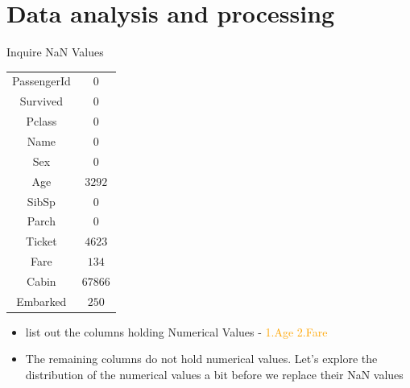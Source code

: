 \documentclass[
size=14pt,
paper=smartboard,  %
mode=present, 		%
display=slides, 	%
style=tuliplab,  	%
pauseslide,
fleqn,leqno]{powerdot}
\begin{document}
	
	\section{Data analysis and processing}
	
	
	\begin{slide}{Inquire NaN Values}
		\begin{center}	\begin{tabular}{c|c}
				\toprule
				\midrule
				{PassengerId}
				&  {$0$} \\
				{Survived}
				&  {$0$} \\
				{Pclass}
				&  {$0$} \\
				{Name}
				&  {$0$} \\
				{Sex}
				&  {$0$} \\
				{Age}
				&  {$3292$} \\
				{SibSp}
				&  {$0$} \\
				{Parch}
				&  {$0$} \\
				{Ticket}
				&  {$4623$} \\
				{Fare}
				&  {$134$} \\
				{Cabin}
				&  {$67866$} \\
				{Embarked}
				&  {$250$} \\
				\bottomrule
			\end{tabular}
		\end{center}
		\vspace{-0.6cm}
		\begin{itemize}
			\item
			list out the columns holding Numerical Values - \textcolor{orange}{1.Age  2.Fare}
			\item
			The remaining columns do not hold numerical values. Let's explore the distribution of the numerical values a bit before we replace their NaN values
		\end{itemize}
	\end{slide}
	
\end{document}
